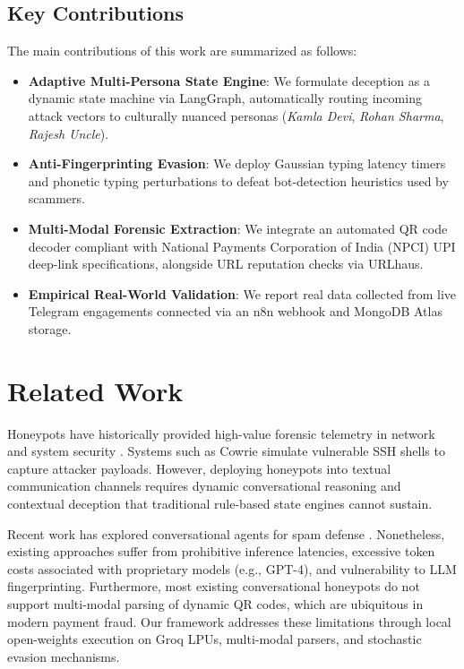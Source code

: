 \documentclass[conference]{IEEEtran}
\begin{document}
\subsection{Key Contributions}
The main contributions of this work are summarized as follows:
\begin{itemize}
    \item \textbf{Adaptive Multi-Persona State Engine}: We formulate deception as a dynamic state machine via LangGraph, automatically routing incoming attack vectors to culturally nuanced personas (\textit{Kamla Devi}, \textit{Rohan Sharma}, \textit{Rajesh Uncle}).
    \item \textbf{Anti-Fingerprinting Evasion}: We deploy Gaussian typing latency timers and phonetic typing perturbations to defeat bot-detection heuristics used by scammers.
    \item \textbf{Multi-Modal Forensic Extraction}: We integrate an automated QR code decoder compliant with National Payments Corporation of India (NPCI) UPI deep-link specifications, alongside URL reputation checks via URLhaus.
    \item \textbf{Empirical Real-World Validation}: We report real data collected from live Telegram engagements connected via an n8n webhook and MongoDB Atlas storage.
\end{itemize}

\section{Related Work}
Honeypots have historically provided high-value forensic telemetry in network and system security \cite{provos2004virtual}. Systems such as Cowrie simulate vulnerable SSH shells to capture attacker payloads. However, deploying honeypots into textual communication channels requires dynamic conversational reasoning and contextual deception that traditional rule-based state engines cannot sustain.

Recent work has explored conversational agents for spam defense \cite{devlin2019bert}. Nonetheless, existing approaches suffer from prohibitive inference latencies, excessive token costs associated with proprietary models (e.g., GPT-4), and vulnerability to LLM fingerprinting. Furthermore, most existing conversational honeypots do not support multi-modal parsing of dynamic QR codes, which are ubiquitous in modern payment fraud. Our framework addresses these limitations through local open-weights execution on Groq LPUs, multi-modal parsers, and stochastic evasion mechanisms.
\end{document}
